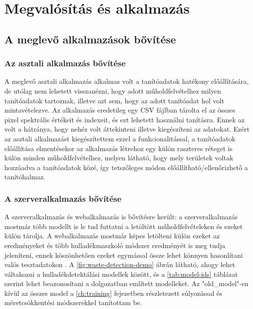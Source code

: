 \chapter{Megvalósítás és alkalmazás}
\label{ch:impl}

\section{A meglevő alkalmazások bővítése}
\label{ch:application-improvement}

\subsection {Az asztali alkalmazás bővítése}

A meglevő asztali alkalmazás alkalmas volt a tanítóadatok hatékony előállítására, de utólag nem lehetett visszanézni, hogy adott műholdfelvételhez milyen tanítóadatok tartoznak, illetve azt sem, hogy az adott tanítóadat hol volt mintavételezve. Az alkalmazás eredetileg egy CSV fájlban \cite{rfc4180} tárolta el az összes pixel spektrális értékeit és indexeit, és ezt lehetett használni tanításra. Ennek az volt a hátránya, hogy nehéz volt áttekinteni illetve kiegészíteni az adatokat. Ezért az asztali alkalmazást kiegészítettem ezzel a funkcionalitással, a tanítóadatok előállítása elmentésekor az alkalmazás létrehoz egy külön raszteres réteget is külön minden műholdfelvételhez, melyen látható, hogy mely területek voltak hozzáadva a tanítóadatok közé, így tetszőleges módon előállítható/ellenőrizhető a tanítóhalmaz.

\subsection {A szerveralkalmazás bővítése}

A szerveralkalmazás és webalkalmazás is bővítésre került: a szerveralkalmazás mostmár több modellt is le tud futtatni a letöltött műholdfelvételeken és ezeket külön tárolja. A webalkalmazás mostmár képes letölteni külön ezeket az eredményeket és több hulladékmaszkoló módszer eredményét is meg tudja jeleníteni, ennek köszönhetően ezeket egymással össze lehet könnyen hasonlítani valós tesztadatokon . A \ref{fig:waste-detection-demo} ábrán látható, ahogy lehet váltakozni a hulladékdetektálási modellek között, és a \ref{tab:model-ids} táblázat szerint lehet beazonosítani a dolgozatban említett modelleket. Az "old\_model"-en kívül az összes model a \ref{ch:training} fejezetben részletezett súlyozással és méretcsökkentési módszerekkel tanítottam be.


